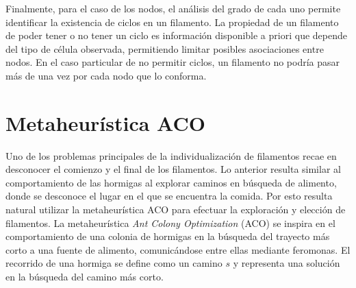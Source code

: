 
Finalmente, para el caso de los nodos, el an\'alisis del grado de cada uno permite identificar la existencia de ciclos  en un filamento. La propiedad de un filamento de poder tener o no tener un ciclo es informaci\'on disponible a priori que depende del tipo de c\'elula observada, permitiendo limitar posibles asociaciones entre nodos. En el caso particular de no permitir ciclos, un filamento no podr\'ia pasar m\'as de una vez por cada nodo que lo conforma. 

\section{Metaheur\'istica ACO}
\label{sec:hormigas}

Uno de los problemas principales de la individualizaci\'on de filamentos recae en desconocer el comienzo y el final de los filamentos. Lo anterior resulta similar al comportamiento de las hormigas al explorar caminos en b\'usqueda de alimento, donde se desconoce el lugar en el que se encuentra la comida. Por esto resulta natural utilizar la metaheur\'istica ACO para efectuar la exploraci\'on y elecci\'on de filamentos. La metaheur\'istica {\it Ant Colony Optimization} (ACO) se inspira en el comportamiento de una colonia de hormigas en la b\'usqueda del trayecto m\'as corto a una fuente de alimento, comunic\'andose entre ellas mediante feromonas. El recorrido de una hormiga se define como un camino $s$ y representa una soluci\'on en la b\'usqueda del camino m\'as corto.

